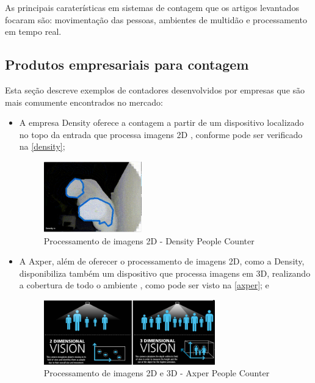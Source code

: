   As principais caraterísticas em sistemas de contagem que os artigos levantados focaram são: movimentação das pessoas, ambientes de multidão e processamento em tempo real.

\subsection{Produtos empresariais para contagem}
\label{produtos-empresas}
Esta seção descreve exemplos de contadores desenvolvidos por empresas que são mais comumente encontrados no mercado:

\begin{itemize}
\item A empresa Density oferece a contagem a partir de um
dispositivo localizado no topo da entrada que processa imagens 2D \cite{Density2017}, conforme pode ser verificado na \autoref{density};

\begin{figure}[htb]
  \caption{\label{density}Processamento de imagens 2D - Density People Counter}
  \begin{center}
    \includegraphics[width=0.40\textwidth]{img/density.png}
  \end{center}
\end{figure}

\item A Axper, além de oferecer o processamento de imagens 2D, como a Density, disponibiliza também um dispositivo que processa imagens em 3D, realizando a cobertura de todo o ambiente \cite{Axper2017}, como pode ser visto na \autoref{axper}; e

\begin{figure}[htb]
  \caption{\label{axper}Processamento de imagens 2D e 3D - Axper People Counter}
  \begin{center}
    \includegraphics[width=0.70\textwidth]{img/axper.png}
  \end{center}
\end{figure}


\end{itemize}
